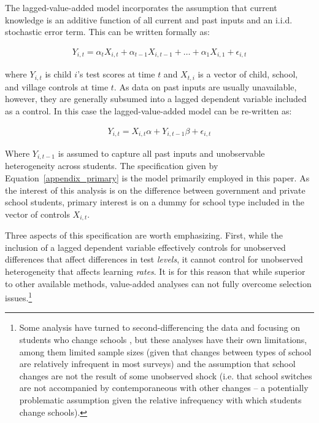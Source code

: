 \documentclass[Eubank_pk_ethnic_sorting.tex]{subfiles}
\begin{document}
The lagged-value-added model incorporates the assumption that current knowledge is an additive function of all current and past inputs and an i.i.d. stochastic error term. This can be written formally as:

\begin{eqnarray}
	Y_{i,t}=\alpha_tX_{i,t}+\alpha_{t-1}X_{i,t-1}+ \dots + \alpha_1X_{i,1} + \epsilon_{i,t}
\end{eqnarray}

where $Y_{i,t}$ is child $i$'s test scores at time $t$ and $X_{t,i}$ is a vector of child, school, and village controls at time $t$. As data on past inputs are usually unavailable, however, they are generally subsumed into a lagged dependent variable included as a control. In this case the lagged-value-added model can be re-written as:

\begin{eqnarray}
	Y_{i,t}=X_{i,t}\alpha+Y_{i,t-1}\beta + \epsilon_{i,t}\label{appendix_primary}
\end{eqnarray}

Where $Y_{i,t-1}$ is assumed to capture all past inputs and unobservable heterogeneity across students. The specification given by Equation~\ref{appendix_primary} is the model primarily employed in this paper. As the interest of this analysis is on the difference between government and private school students, primary interest is on a dummy for school type included in the vector of controls $X_{i,t}$.

Three aspects of this specification are worth emphasizing. First, while the inclusion of a lagged dependent variable effectively controls for unobserved differences that affect differences in test \emph{levels}, it cannot control for unobserved heterogeneity that affects learning \emph{rates}. It is for this reason that while superior to other available methods, value-added analyses can not fully overcome selection issues.\footnote{Some analysis have turned to second-differencing the data and focusing on students who change schools \citep{Andrabi:2011hl}, but these analyses have their own limitations, among them limited sample sizes (given that changes between types of school are relatively infrequent in most surveys) and the assumption that school changes are not the result of some unobserved shock (i.e. that school switches are not accompanied by contemporaneous with other changes -- a potentially problematic assumption given the relative infrequency with which students change schools).}
\end{document}
